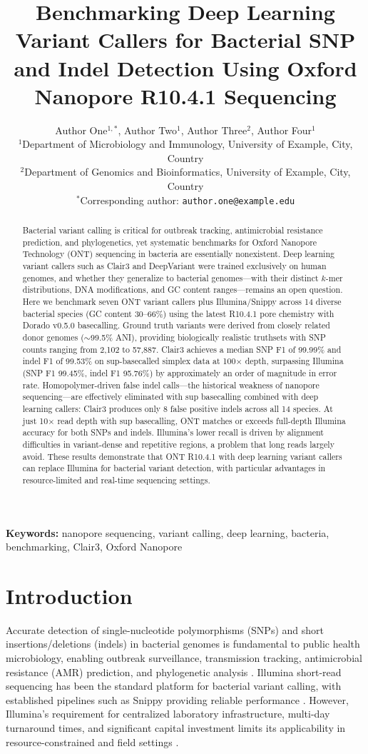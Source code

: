 \documentclass[11pt]{article}
\title{Benchmarking Deep Learning Variant Callers for Bacterial SNP and Indel Detection Using Oxford Nanopore R10.4.1 Sequencing}
\author{
Author One$^{1,*}$, Author Two$^{1}$, Author Three$^{2}$, Author Four$^{1}$ \\[6pt]
\small $^{1}$Department of Microbiology and Immunology, University of Example, City, Country \\
\small $^{2}$Department of Genomics and Bioinformatics, University of Example, City, Country \\
\small $^{*}$Corresponding author: \texttt{author.one@example.edu}
}
\date{}
\begin{document}
\maketitle

\begin{abstract}
Bacterial variant calling is critical for outbreak tracking, antimicrobial resistance prediction, and phylogenetics, yet systematic benchmarks for Oxford Nanopore Technology (ONT) sequencing in bacteria are essentially nonexistent. Deep learning variant callers such as Clair3 and DeepVariant were trained exclusively on human genomes, and whether they generalize to bacterial genomes---with their distinct $k$-mer distributions, DNA modifications, and GC content ranges---remains an open question. Here we benchmark seven ONT variant callers plus Illumina/Snippy across 14 diverse bacterial species (GC content 30--66\%) using the latest R10.4.1 pore chemistry with Dorado v0.5.0 basecalling. Ground truth variants were derived from closely related donor genomes ($\sim$99.5\% ANI), providing biologically realistic truthsets with SNP counts ranging from 2,102 to 57,887. Clair3 achieves a median SNP F1 of 99.99\% and indel F1 of 99.53\% on sup-basecalled simplex data at 100$\times$ depth, surpassing Illumina (SNP F1 99.45\%, indel F1 95.76\%) by approximately an order of magnitude in error rate. Homopolymer-driven false indel calls---the historical weakness of nanopore sequencing---are effectively eliminated with sup basecalling combined with deep learning callers: Clair3 produces only 8 false positive indels across all 14 species. At just 10$\times$ read depth with sup basecalling, ONT matches or exceeds full-depth Illumina accuracy for both SNPs and indels. Illumina's lower recall is driven by alignment difficulties in variant-dense and repetitive regions, a problem that long reads largely avoid. These results demonstrate that ONT R10.4.1 with deep learning variant callers can replace Illumina for bacterial variant detection, with particular advantages in resource-limited and real-time sequencing settings.
\end{abstract}

\noindent\textbf{Keywords:} nanopore sequencing, variant calling, deep learning, bacteria, benchmarking, Clair3, Oxford Nanopore

\section{Introduction}

Accurate detection of single-nucleotide polymorphisms (SNPs) and short insertions/deletions (indels) in bacterial genomes is fundamental to public health microbiology, enabling outbreak surveillance, transmission tracking, antimicrobial resistance (AMR) prediction, and phylogenetic analysis \citep{Kwong2015,Gardy2018}. Illumina short-read sequencing has been the standard platform for bacterial variant calling, with established pipelines such as Snippy providing reliable performance \citep{Seemann2020}. However, Illumina's requirement for centralized laboratory infrastructure, multi-day turnaround times, and significant capital investment limits its applicability in resource-constrained and field settings \citep{Quick2016}.
\end{document}
